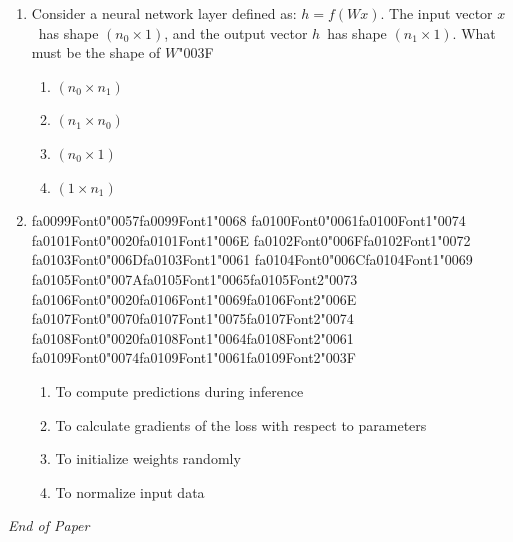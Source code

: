 \documentclass[12pt]{article}
\begin{document}
\begin{enumerate}[label=Q\arabic*.]
\begin{enumerate}[label=(\Alph*)]
    \item Only the input at time $t$
    \item Only the hidden state at time $t-1$
    \item Both the input at time $t$ and the hidden state at time $t-1$
    \item All future inputs
\end{enumerate}
\item Consider a neural network layer defined as: $h = f(Wx)$. The input vector $x$\ has shape $(n_0 \times 1)$, and the output vector $h$\ has shape $(n_1 \times 1)$. What must be the shape of $W${\char"003F}
\begin{enumerate}[label=(\Alph*)]
    \item $(n_0 \times n_1)$
    \item $(n_1 \times n_0)$
    \item $(n_0 \times 1)$
    \item $(1 \times n_1)$
\end{enumerate}
\item {\csname fa0099Font0\endcsname\char"0057}{\csname fa0099Font1\endcsname\char"0068} {\csname fa0100Font0\endcsname\char"0061}{\csname fa0100Font1\endcsname\char"0074} {\csname fa0101Font0\endcsname\char"0020}{\csname fa0101Font1\endcsname\char"006E} {\csname fa0102Font0\endcsname\char"006F}{\csname fa0102Font1\endcsname\char"0072} {\csname fa0103Font0\endcsname\char"006D}{\csname fa0103Font1\endcsname\char"0061} {\csname fa0104Font0\endcsname\char"006C}{\csname fa0104Font1\endcsname\char"0069} {\csname fa0105Font0\endcsname\char"007A}{\csname fa0105Font1\endcsname\char"0065}{\csname fa0105Font2\endcsname\char"0073} {\csname fa0106Font0\endcsname\char"0020}{\csname fa0106Font1\endcsname\char"0069}{\csname fa0106Font2\endcsname\char"006E} {\csname fa0107Font0\endcsname\char"0070}{\csname fa0107Font1\endcsname\char"0075}{\csname fa0107Font2\endcsname\char"0074} {\csname fa0108Font0\endcsname\char"0020}{\csname fa0108Font1\endcsname\char"0064}{\csname fa0108Font2\endcsname\char"0061} {\csname fa0109Font0\endcsname\char"0074}{\csname fa0109Font1\endcsname\char"0061}{\csname fa0109Font2\endcsname\char"003F}
\begin{enumerate}[label=(\Alph*)]
    \item To compute predictions during inference
    \item To calculate gradients of the loss with respect to parameters
    \item To initialize weights randomly
    \item To normalize input data
\end{enumerate}
\end{enumerate}

\vfill
\noindent\textit{End of Paper}
\end{document}
